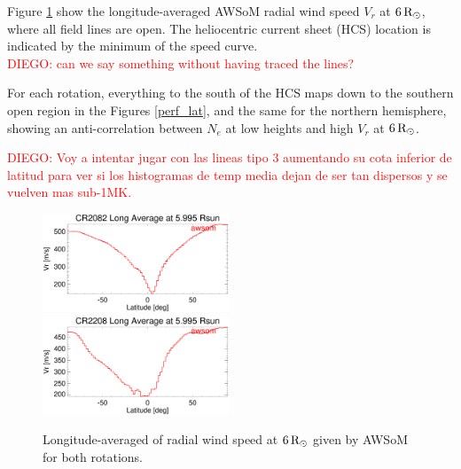 \documentclass[namedreferences]{solarphysics}
\newcommand{\mrsun}{{\rm R_\odot}}
\def\diego#1{\textcolor{red}{DIEGO: #1}}
\begin{document}
\begin{article}



Figure \ref{perf_lon_vr} show the longitude-averaged AWSoM radial wind speed $V_r$ at $6\,\mrsun$, where all field lines are open. The heliocentric current sheet (HCS) location is indicated by the minimum of the speed curve.\\
\diego{can we say something without having traced the lines?}

For each rotation, everything to the south of the HCS maps down to the southern open region in the Figures \ref{perf_lat}, and the same for the northern hemisphere, showing an anti-correlation between $N_e$ at low heights and high $V_r$ at $6\,\mrsun$.

\diego{Voy a intentar jugar con las lineas tipo 3 aumentando su cota inferior de latitud para ver si los histogramas de temp media dejan de ser tan dispersos y se vuelven mas sub-1MK. }


\begin{figure}[h!]
\begin{center}
\includegraphics[width=0.495\textwidth]{figs/Perfil_Vr_2082_5995.eps}
\includegraphics[width=0.495\textwidth]{figs/Perfil_Vr_2208_5995.eps}
\caption{Longitude-averaged of radial wind speed at $6\,\mrsun$ given by AWSoM for both rotations.}
\label{perf_lon_vr}
\end{center}
\end{figure}




\end{article}
\end{document}
